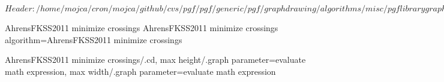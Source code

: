 %
%
%

\ProvidesFileRCS[v\pgfversion] $Header: /home/mojca/cron/mojca/github/cvs/pgf/pgf/generic/pgf/graphdrawing/algorithms/misc/pgflibrarygraphdrawing.misc.code.tex,v 1.2 2011/05/11 15:02:31 tantau Exp $




%
%
%
%

\pgfgddeclarealgorithmkey
{AhrensFKSS2011 minimize crossings}
{AhrensFKSS2011 minimize crossings}
{%
  algorithm=AhrensFKSS2011 minimize crossings
}

\pgfgdset
{%
  AhrensFKSS2011 minimize crossings/.cd,
  max height/.graph parameter=evaluate math expression,
  max width/.graph parameter=evaluate math expression
}



\endinput